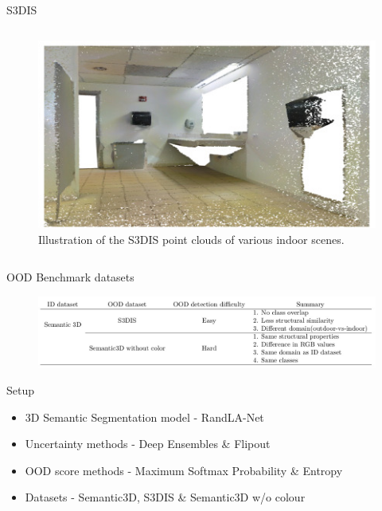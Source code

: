 \documentclass[aspectratio=169]{beamer}
\begin{document}
\begin{frame}{S3DIS}
\begin{columns}
\begin{column}{0.4\textwidth}
\begin{figure}
                \includegraphics[scale=0.35]{images/s3dis/s3dis_sample_2.jpg}
                \caption{Illustration of the S3DIS point clouds of various indoor scenes.}
                \label{fig:s3dis_sample_images}
            \end{figure}
        \end{column}
    \end{columns}
\end{frame}
\begin{frame}{OOD Benchmark datasets}
    \begin{figure}
        \centering
        \includegraphics[scale=0.33]{images/benchmark_table.jpg}
    \end{figure}
    \begin{table}
        \caption{Table representing the ID dataset and corresponding OOD datasets, difficulty in OOD detection
        and the summary of reasons to chose this OOD dataset.}
    \end{table}
\end{frame}
\begin{frame}[noframenumbering]{Setup}
    \begin{itemize}
        \item 3D Semantic Segmentation model - RandLA-Net
        \item Uncertainty methods - Deep Ensembles \& Flipout
        \item OOD score methods - Maximum Softmax Probability \& Entropy
        \item Datasets - Semantic3D, S3DIS \& Semantic3D w/o colour
    \end{itemize}
\end{frame}
\end{document}
